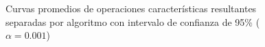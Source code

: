 \begin{figure}[!ht]
\caption[Curva operaciones promedio junto con intervalo de confianza de 95\% ($\alpha=0.001$)]{Curvas promedios de operaciones características resultantes separadas por algoritmo con intervalo de confianza de 95\%  ($\alpha=0.001$)}
\label{fig:resultado_global_ci_1}
\end{figure}


